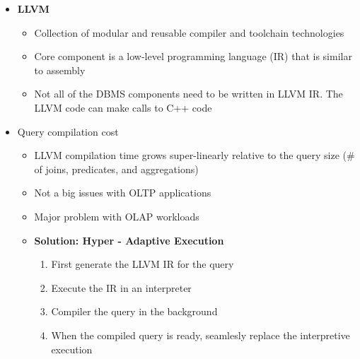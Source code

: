 \documentclass[11pt]{article}
\begin{document}
\begin{itemize}
\begin{itemize}
        \item \textbf{LLVM}
        \begin{itemize}
            \item Collection of modular and reusable compiler and toolchain technologies
            \item Core component is a low-level programming language (IR) that is similar to assembly
            \item Not all of the DBMS components need to be written in LLVM IR. The LLVM code can make calls to C++ code
        \end{itemize}
        \item Query compilation cost
        \begin{itemize}
            \item LLVM compilation time grows super-linearly relative to the query size (# of joins, predicates, and aggregations)
            \item Not a big issues with OLTP applications
            \item Major problem with OLAP workloads
            \item \textbf{Solution: Hyper - Adaptive Execution}
            \begin{enumerate}
                \item First generate the LLVM IR for the query
                \item Execute the IR in an interpreter
                \item Compiler the query in the background
                \item When the compiled query is ready, seamlesly replace the interpretive execution
            \end{enumerate}
        \end{itemize}
    \end{itemize}
\end{itemize}
\end{document}
